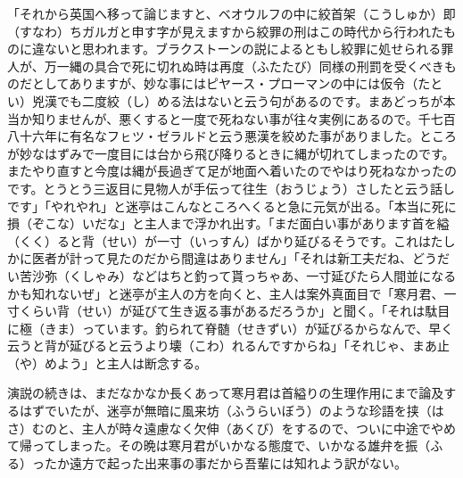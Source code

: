\documentclass{book}
\begin{document}
「それから英国へ移って論じますと、ベオウルフの中に絞首架（こうしゅか）即（すなわ）ちガルガと申す字が見えますから絞罪の刑はこの時代から行われたものに違ないと思われます。ブラクストーンの説によるともし絞罪に処せられる罪人が、万一縄の具合で死に切れぬ時は再度（ふたたび）同様の刑罰を受くべきものだとしてありますが、妙な事にはピヤース・プローマンの中には仮令（たとい）兇漢でも二度絞（し）める法はないと云う句があるのです。まあどっちが本当か知りませんが、悪くすると一度で死ねない事が往々実例にあるので。千七百八十六年に有名なフㇶツ・ゼラルドと云う悪漢を絞めた事がありました。ところが妙なはずみで一度目には台から飛び降りるときに縄が切れてしまったのです。またやり直すと今度は縄が長過ぎて足が地面へ着いたのでやはり死ねなかったのです。とうとう三返目に見物人が手伝って往生（おうじょう）さしたと云う話しです」「やれやれ」と迷亭はこんなところへくると急に元気が出る。「本当に死に損（ぞこな）いだな」と主人まで浮かれ出す。「まだ面白い事があります首を縊（くく）ると背（せい）が一寸（いっすん）ばかり延びるそうです。これはたしかに医者が計って見たのだから間違はありません」「それは新工夫だね、どうだい苦沙弥（くしゃみ）などはちと釣って貰っちゃあ、一寸延びたら人間並になるかも知れないぜ」と迷亭が主人の方を向くと、主人は案外真面目で「寒月君、一寸くらい背（せい）が延びて生き返る事があるだろうか」と聞く。「それは駄目に極（きま）っています。釣られて脊髄（せきずい）が延びるからなんで、早く云うと背が延びると云うより壊（こわ）れるんですからね」「それじゃ、まあ止（や）めよう」と主人は断念する。

演説の続きは、まだなかなか長くあって寒月君は首縊りの生理作用にまで論及するはずでいたが、迷亭が無暗に風来坊（ふうらいぼう）のような珍語を挟（はさ）むのと、主人が時々遠慮なく欠伸（あくび）をするので、ついに中途でやめて帰ってしまった。その晩は寒月君がいかなる態度で、いかなる雄弁を振（ふる）ったか遠方で起った出来事の事だから吾輩には知れよう訳がない。
\end{document}
